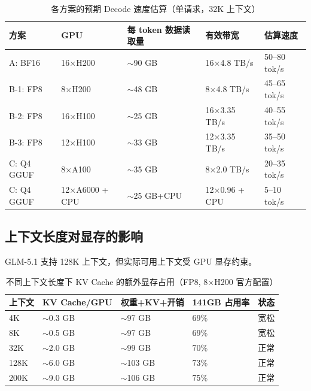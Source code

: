 \documentclass[UTF8,a4paper,10pt,oneside]{ctexart}
\begin{document}
\begin{table}[htbp]
\centering
\caption{各方案的预期 Decode 速度估算（单请求，32K 上下文）}
\begin{tabular}{p{3cm}p{1.8cm}p{2.2cm}p{2.5cm}p{2cm}}
\hline
\textbf{方案} & \textbf{GPU} & \textbf{每 token 数据读取量} & \textbf{有效带宽} & \textbf{估算速度} \\
\hline
A: BF16 & 16$\times$H200 & $\sim$90 GB & 16$\times$4.8 TB/s & 50--80 tok/s \\
B-1: FP8 & 8$\times$H200 & $\sim$48 GB & 8$\times$4.8 TB/s & 45--65 tok/s \\
B-2: FP8 & 16$\times$H100 & $\sim$25 GB & 16$\times$3.35 TB/s & 40--55 tok/s \\
B-3: FP8 & 12$\times$H100 & $\sim$33 GB & 12$\times$3.35 TB/s & 35--50 tok/s \\
C: Q4 GGUF & 8$\times$A100 & $\sim$35 GB & 8$\times$2.0 TB/s & 20--35 tok/s \\
C: Q4 GGUF & 12$\times$A6000 + CPU & $\sim$25 GB+CPU & 12$\times$0.96 + CPU & 5--10 tok/s \\
\hline
\end{tabular}
\end{table}

\subsection{上下文长度对显存的影响}

GLM-5.1 支持 128K 上下文，但实际可用上下文受 GPU 显存约束。

\begin{table}[htbp]
\centering
\caption{不同上下文长度下 KV Cache 的额外显存占用（FP8, 8$\times$H200 官方配置）}
\begin{tabular}{p{2.5cm}p{2.2cm}p{3cm}p{2.2cm}p{2.2cm}}
\hline
\textbf{上下文} & \textbf{KV Cache/GPU} & \textbf{权重+KV+开销} & \textbf{141GB 占用率} & \textbf{状态} \\
\hline
4K & $\sim$0.3 GB & $\sim$97 GB & 69\% & 宽松 \\
8K & $\sim$0.5 GB & $\sim$97 GB & 69\% & 宽松 \\
32K & $\sim$2.0 GB & $\sim$99 GB & 70\% & 正常 \\
128K & $\sim$6.0 GB & $\sim$103 GB & 73\% & 正常 \\
200K & $\sim$9.0 GB & $\sim$106 GB & 75\% & 正常 \\
\hline
\end{tabular}
\end{table}
\end{document}
